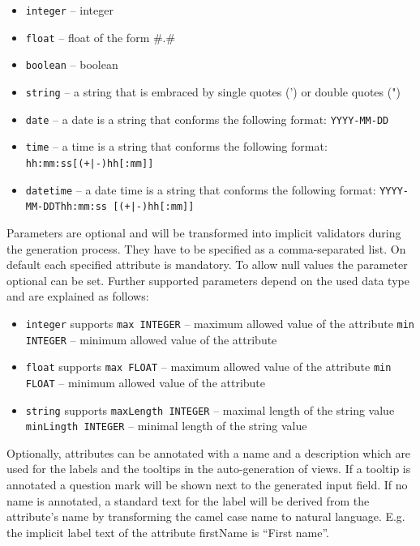 \begin{itemize}
\item{\lstinline!integer! -- integer}
\item{\lstinline!float! -- float of the form \#.\#}
\item{\lstinline!boolean! -- boolean}
\item{\lstinline!string! -- a string that is embraced by single quotes (') or double quotes (")}
\item{\lstinline!date! -- a date is a string that conforms the following format: \lstinline!YYYY-MM-DD!}
\item{\lstinline!time! -- a time is a string that conforms the following format: \lstinline!hh:mm:ss[(+|-)hh[:mm]]!}
\item{\lstinline!datetime! -- a date time is a string that conforms the following format: \lstinline!YYYY-MM-DDThh:mm:ss [(+|-)hh[:mm]]!}
\end{itemize}

Parameters are optional and will be transformed into implicit validators during the generation process. They have to be specified as a comma-separated list. On default each specified attribute is mandatory. To allow null values the parameter optional can be set. Further supported parameters depend on the used data type and are explained as follows:

\begin{itemize}
\item \lstinline!integer! supports
\subitem \lstinline!max INTEGER! – maximum allowed value of the attribute
\subitem \lstinline!min INTEGER! – minimum allowed value of the attribute
\item \lstinline!float! supports
\subitem \lstinline!max FLOAT! – maximum allowed value of the attribute
\subitem \lstinline!min FLOAT! – minimum allowed value of the attribute
\item \lstinline!string! supports
\subitem \lstinline!maxLength INTEGER! – maximal length of the string value
\subitem \lstinline!minLingth INTEGER! – minimal length of the string value
\end{itemize}

Optionally, attributes can be annotated with a name and a description which are used for the labels and the tooltips in the auto-generation of views. If a tooltip is annotated a question mark will be shown next to the generated input field. If no name is annotated, a standard text for the label will be derived from the attribute's name by transforming the camel case name to natural language. E.g. the implicit label text of the attribute firstName is \enquote{First name}.

